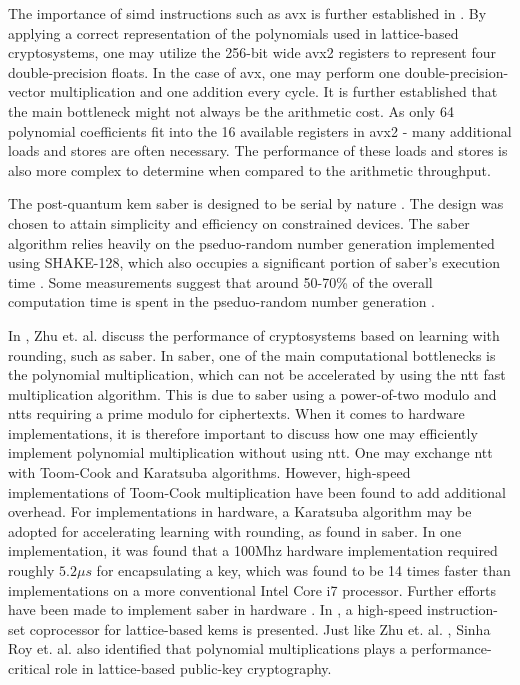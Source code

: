 The importance of \gls{simd} instructions such as \gls{avx} is further established in \cite{guneysu2013}. By applying a correct representation of the polynomials used in lattice-based cryptosystems, one may utilize the 256-bit wide \gls{avx2} registers to represent four double-precision floats. In the case of \gls{avx}, one may perform one double-precision-vector multiplication and one addition every cycle. It is further established that the main bottleneck might not always be the arithmetic cost. As only 64 polynomial coefficients fit into the 16 available registers in \gls{avx2} - many additional loads and stores are often necessary. The performance of these loads and stores is also more complex to determine when compared to the arithmetic throughput.

The \gls{post-quantum} \gls{kem} \gls{saber} is designed to be serial by nature \cite{sinha2019}. The design was chosen to attain simplicity and efficiency on constrained devices. The \gls{saber} algorithm relies heavily on the pseduo-random number generation implemented using SHAKE-128, which also occupies a significant portion of \gls{saber}'s execution time \cite{sinha2019}. Some measurements suggest that around 50-70\% of the overall computation time is spent in the pseduo-random number generation \cite{saber}.

In \cite{zhu2021}, Zhu et. al. discuss the performance of cryptosystems based on learning with rounding, such as \gls{saber}. In \gls{saber}, one of the main computational bottlenecks is the polynomial multiplication, which can not be accelerated by using the \gls{ntt} fast multiplication algorithm. This is due to \gls{saber} using a power-of-two modulo and \glspl{ntt} requiring a prime modulo for ciphertexts. When it comes to hardware implementations, it is therefore important to discuss how one may efficiently implement polynomial multiplication without using \gls{ntt}. One may exchange \gls{ntt} with Toom-Cook and Karatsuba algorithms. However, high-speed implementations of Toom-Cook multiplication have been found to add additional overhead. For implementations in hardware, a Karatsuba algorithm may be adopted for accelerating learning with rounding, as found in \gls{saber}. In one implementation, it was found that a 100Mhz hardware implementation required roughly $5.2\mu s$ for encapsulating a key, which was found to be 14 times faster than implementations on a more conventional Intel Core i7 processor. Further efforts have been made to implement \gls{saber} in hardware \cite{roy2020}. In \cite{roy2020}, a high-speed instruction-set coprocessor for lattice-based \glspl{kem} is presented. Just like Zhu et. al. \cite{zhu2021}, Sinha Roy et. al. \cite{roy2020} also identified that polynomial multiplications plays a performance-critical role in lattice-based public-key cryptography.

